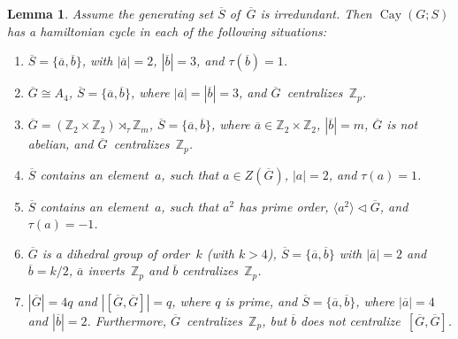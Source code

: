 \documentclass[]{amcjoucc}
\theoremstyle{plain}
\newtheorem{lem}[equation]{Lemma}
\theoremstyle{definition}
\theoremstyle{definition}
\DeclareMathOperator{\Cay}{Cay}
\newcommand{\iso}{\cong}
\newcommand{\quot}{\overline}
\newcommand{\ZZ}{\mathbb{Z}}
\newcommand{\normal}{\triangleleft}
\begin{document}
\begin{lem} \label{IrredSpecialCases}
Assume the generating set $\quot S$ of~$\quot G$ is irredundant.
Then $\Cay(G;S)$ has a hamiltonian cycle in each of the following situations:
\smallskip
	\begin{enumerate}

	\item \label{IrredSpecialCases-23} 
	$\quot S = \{\quot a, \quot b\}$, with\/ $|\quot a| = 2$, $|\quot b| = 3$, and $\tau(\quot b) = 1$.
	
 	\item \label{IrredSpecialCases-A4xZp}
	$\quot G \iso A_4$,  $\quot S= \{\quot a, \quot b\}$, where $|\quot a| = |\quot b| = 3$, and $\quot G$~centralizes~$\ZZ_p$. 

	\item \label{IrredSpecialCases-GeneralizeA4}
	$\quot G = (\ZZ_2 \times \ZZ_2) \rtimes_\tau \ZZ_m$, $\quot S= \{\quot a, \quot b\}$, where $\quot a \in \ZZ_2 \times \ZZ_2$, $|\quot b| = m$, $\quot G$ is not abelian, and $\quot G$~centralizes~$\ZZ_p$. 

	\item \label{IrredSpecialCases-CentralInS}
	$\quot S$ contains an element~$a$, such that $a \in Z(\quot G)$, $|a| = 2$, and $\tau(a) = 1$.

	\item \label{IrredSpecialCases-a2Normal}
	 $\quot S$ contains an element~$a$, such that $a^2$ has prime order, $\langle a^2\rangle \normal \quot G$, and $\tau(a) = -1$.
	 
	 \item \label{IrredSpecialCases-GisDihedral}
	$\quot G$ is a dihedral group of order~$k$ \textup(with $k > 4$\textup), $\quot S = \{\quot a, \quot b\}$ with $|\quot a| = 2$ and $\quot b = k/2$, $\quot a$ inverts~$\ZZ_p$ and $\quot b$ centralizes~$\ZZ_p$.
	
	\item \label{IrredSpecialCases-ZqxZ4}
	$|\quot G| = 4q$ and $|[\quot G, \quot G]| = q$, where $q$ is prime, and $\quot S = \{\quot a, \quot b\}$, where $|\quot a| = 4$ and $|\quot b| = 2$. Furthermore, $\quot G$~centralizes~$\ZZ_p$, but $\quot b$ does not centralize~$[\quot G, \quot G]$.
	
	\end{enumerate}
\end{lem}
\end{document}
